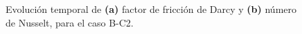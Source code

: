 %

\begin{figure}[H]
  \centering  
    
  \caption{Evolución temporal de \textbf{(a)} factor de fricción de Darcy y \textbf{(b)} número de Nusselt, para el caso B-C2.}
  \label{fig:bc2-1}
\end{figure}


